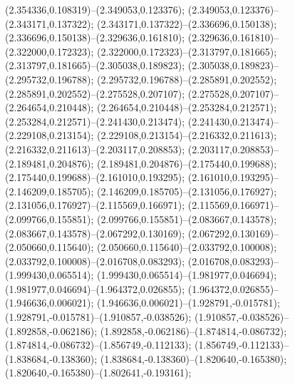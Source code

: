  (2.354336,0.108319)--(2.349053,0.123376);
 (2.349053,0.123376)--(2.343171,0.137322);
 (2.343171,0.137322)--(2.336696,0.150138);
 (2.336696,0.150138)--(2.329636,0.161810);
 (2.329636,0.161810)--(2.322000,0.172323);
 (2.322000,0.172323)--(2.313797,0.181665);
 (2.313797,0.181665)--(2.305038,0.189823);
 (2.305038,0.189823)--(2.295732,0.196788);
 (2.295732,0.196788)--(2.285891,0.202552);
 (2.285891,0.202552)--(2.275528,0.207107);
 (2.275528,0.207107)--(2.264654,0.210448);
 (2.264654,0.210448)--(2.253284,0.212571);
 (2.253284,0.212571)--(2.241430,0.213474);
 (2.241430,0.213474)--(2.229108,0.213154);
 (2.229108,0.213154)--(2.216332,0.211613);
 (2.216332,0.211613)--(2.203117,0.208853);
 (2.203117,0.208853)--(2.189481,0.204876);
 (2.189481,0.204876)--(2.175440,0.199688);
 (2.175440,0.199688)--(2.161010,0.193295);
 (2.161010,0.193295)--(2.146209,0.185705);
 (2.146209,0.185705)--(2.131056,0.176927);
 (2.131056,0.176927)--(2.115569,0.166971);
 (2.115569,0.166971)--(2.099766,0.155851);
 (2.099766,0.155851)--(2.083667,0.143578);
 (2.083667,0.143578)--(2.067292,0.130169);
 (2.067292,0.130169)--(2.050660,0.115640);
 (2.050660,0.115640)--(2.033792,0.100008);
 (2.033792,0.100008)--(2.016708,0.083293);
 (2.016708,0.083293)--(1.999430,0.065514);
 (1.999430,0.065514)--(1.981977,0.046694);
 (1.981977,0.046694)--(1.964372,0.026855);
 (1.964372,0.026855)--(1.946636,0.006021);
 (1.946636,0.006021)--(1.928791,-0.015781);
 (1.928791,-0.015781)--(1.910857,-0.038526);
 (1.910857,-0.038526)--(1.892858,-0.062186);
 (1.892858,-0.062186)--(1.874814,-0.086732);
 (1.874814,-0.086732)--(1.856749,-0.112133);
 (1.856749,-0.112133)--(1.838684,-0.138360);
 (1.838684,-0.138360)--(1.820640,-0.165380);
 (1.820640,-0.165380)--(1.802641,-0.193161);
